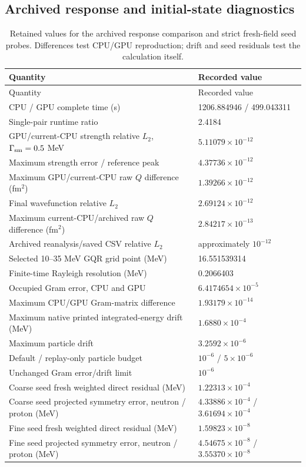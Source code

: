 \documentclass[11pt,a4paper]{article}
\begin{document}
\subsection{Archived response and initial-state diagnostics}
\begin{longtable}{@{}p{.60\linewidth}p{.31\linewidth}@{}}
\caption{Retained values for the archived response comparison and strict fresh-field seed probes. Differences test CPU/GPU reproduction; drift and seed residuals test the calculation itself.}\label{tab:response-record}\\
\toprule Quantity & Recorded value\\\midrule\endfirsthead
\toprule Quantity & Recorded value\\\midrule\endhead
CPU / GPU complete time (s) & 1206.884946 / 499.043311\\
Single-pair runtime ratio & 2.4184\\
GPU/current-CPU strength relative $L_2$, $\Gamma_{\rm sm}=0.5$ MeV & $5.11079\times10^{-12}$\\
Maximum strength error / reference peak & $4.37736\times10^{-12}$\\
Maximum GPU/current-CPU raw $Q$ difference (fm$^2$) & $1.39266\times10^{-12}$\\
Final wavefunction relative $L_2$ & $2.69124\times10^{-12}$\\
Maximum current-CPU/archived raw $Q$ difference (fm$^2$) & $2.84217\times10^{-13}$\\
Archived reanalysis/saved CSV relative $L_2$ & approximately $10^{-12}$\\
Selected 10--35 MeV GQR grid point (MeV) & 16.551539314\\
Finite-time Rayleigh resolution (MeV) & 0.2066403\\
Occupied Gram error, CPU and GPU & $6.4174654\times10^{-5}$\\
Maximum CPU/GPU Gram-matrix difference & $1.93179\times10^{-14}$\\
Maximum native printed integrated-energy drift (MeV) & $1.6880\times10^{-4}$\\
Maximum particle drift & $3.2592\times10^{-6}$\\
Default / replay-only particle budget & $10^{-6}$ / $5\times10^{-6}$\\
Unchanged Gram error/drift limit & $10^{-6}$\\
Coarse seed fresh weighted direct residual (MeV) & $1.22313\times10^{-4}$\\
Coarse seed projected symmetry error, neutron / proton (MeV) & $4.33886\times10^{-4}$ / $3.61694\times10^{-4}$\\
Fine seed fresh weighted direct residual (MeV) & $1.59823\times10^{-8}$\\
Fine seed projected symmetry error, neutron / proton (MeV) & $4.54675\times10^{-8}$ / $3.55370\times10^{-8}$\\
\bottomrule
\end{longtable}
\end{document}
